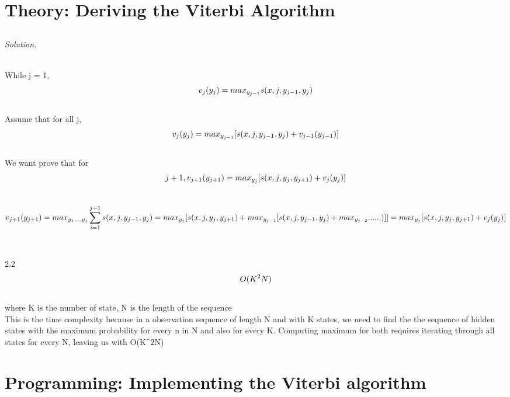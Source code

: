 \documentclass[12pt]{article}
\newcommand\sol[1]{\begin{mdframed}
\emph{Solution.} #1
\end{mdframed}}
\begin{document}
\section{Theory: Deriving the Viterbi Algorithm}

\subsection{}

\sol{

\\While j = 1, 
\begin{equation*}
\\v_j(y_j) = max_{{y_{j-1}}} s(x,j,y_{j-1},y_j)
\end{equation*}
    \\Assume that for all j, 
\begin{equation*}
\\v_j(y_j) = max_{{y_{j-1}}} [s(x,j,y_{j-1},y_j) + v_{j-1}(y_{j-1})]
\end{equation*}
\\We want prove that for 
\begin{equation*}
{j+1}, \\v_{j+1}(y_{j+1}) = max_{{y_{j}}} [s(x,j,y_{j},y_{j+1}) + v_{j}(y_{j})]
\end{equation*}
\\
\begin{equation*}
\\v_{j+1}(y_{j+1}) = max_{{y_1},..,{y_{j}}}\sum_{i=1}^{j+1}s(x,j,y_{j-1},y_j)
= max_{{y_{j}}} [s(x,j,y_{j},y_{j+1}) + max_{{y_{j-1}}} [s(x,j,y_{j-1},y_j) + max_{{y_{j-2}}}......)]] = max_{{y_{j}}} [s(x,j,y_{j},y_{j+1}) + v_{j}(y_{j})]
\end{equation*}
\\
\\2.2
\begin{equation*}
\\O(K^2N) 
\end{equation*}
\\where K is the number of state, N is the length of the sequence
\\This is the time complexity because in a observation sequence of length N and with K states, we need to find the the sequence of hidden states with the maximum probability for every n in N and also for every K. Computing maximum for both requires iterating through all states for every N, leaving us with O(K^2N)
}

\section{Programming: Implementing the Viterbi algorithm }
\end{document}
